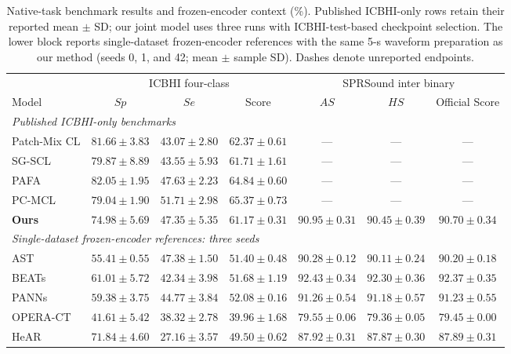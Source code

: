 \begin{table}[t]
\caption{Native-task benchmark results and frozen-encoder context (\%).
Published ICBHI-only rows retain their reported mean $\pm$ SD; our joint
model uses three runs with ICBHI-test-based checkpoint selection.
The lower block reports single-dataset frozen-encoder references with
the same 5-s waveform preparation as our method (seeds 0, 1, and 42;
mean $\pm$ sample SD). Dashes denote unreported endpoints.}
\label{tab:native_results}
\centering
\small
\setlength{\tabcolsep}{3pt}
\begin{tabular*}{\textwidth}{@{\extracolsep{\fill}}lcccccc@{}}
\toprule
& \multicolumn{3}{c}{ICBHI four-class\cite{rocha2019icbhi}}
& \multicolumn{3}{c}{SPRSound inter binary\cite{zhang2022sprsound}}\\
\cmidrule(lr){2-4}\cmidrule(lr){5-7}
Model & $Sp$ & $Se$ & Score & $AS$ & $HS$ & Official Score\\
\midrule
\multicolumn{7}{l}{\textit{Published ICBHI-only benchmarks}}\\
Patch-Mix CL\cite{bae2023patchmix}
& $81.66\pm3.83$ & $43.07\pm2.80$ & $62.37\pm0.61$
& --- & --- & ---\\
SG-SCL\cite{kim2024sgscl}
& $79.87\pm8.89$ & $43.55\pm5.93$ & $61.71\pm1.61$
& --- & --- & ---\\
PAFA\cite{jeong2025pafa}
& $82.05\pm1.95$ & $47.63\pm2.23$ & $64.84\pm0.60$
& --- & --- & ---\\
PC-MCL\cite{jeong2026pcmcl}
& $79.04\pm1.90$ & $51.71\pm2.98$ & $65.37\pm0.73$
& --- & --- & ---\\
\midrule
\textbf{Ours}
& $74.98\pm5.69$ & $47.35\pm5.35$ & $61.17\pm0.31$
& $90.95\pm0.31$ & $90.45\pm0.39$ & $90.70\pm0.34$\\
\midrule
\multicolumn{7}{l}{\textit{Single-dataset frozen-encoder references: three seeds}}\\
AST\cite{gong2021ast}
& $55.41\pm0.55$ & $47.38\pm1.50$ & $51.40\pm0.48$
& $90.28\pm0.12$ & $90.11\pm0.24$ & $90.20\pm0.18$\\
BEATs\cite{chen2023beats}
& $61.01\pm5.72$ & $42.34\pm3.98$ & $51.68\pm1.19$
& $92.43\pm0.34$ & $92.30\pm0.36$ & $92.37\pm0.35$\\
PANNs\cite{kong2020panns}
& $59.38\pm3.75$ & $44.77\pm3.84$ & $52.08\pm0.16$
& $91.26\pm0.54$ & $91.18\pm0.57$ & $91.23\pm0.55$\\
OPERA-CT\cite{zhang2024opera}
& $41.61\pm5.42$ & $38.32\pm2.78$ & $39.96\pm1.68$
& $79.55\pm0.06$ & $79.36\pm0.05$ & $79.45\pm0.00$\\
HeAR\cite{baur2024hear}
& $71.84\pm4.60$ & $27.16\pm3.57$ & $49.50\pm0.62$
& $87.92\pm0.31$ & $87.87\pm0.30$ & $87.89\pm0.31$\\
\bottomrule
\end{tabular*}
\end{table}
